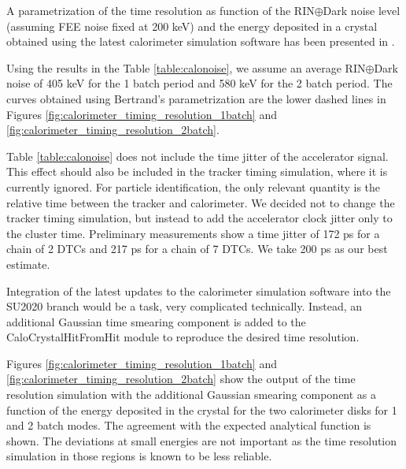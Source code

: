 A parametrization of the time resolution as function of the RIN$\oplus$Dark noise level (assuming FEE noise fixed at 200 keV) and the energy deposited
in a crystal obtained using the latest calorimeter simulation software has been presented in  \cite{MU2E_36225_CALO_TIME_RES}.

Using the results in the Table \ref{table:calonoise}, we assume an average RIN$\oplus$Dark noise of 405 keV for the 1 batch period and 580 keV for the 2 batch period. 
The curves obtained using Bertrand's parametrization are the lower dashed
lines in Figures \ref{fig:calorimeter_timing_resolution_1batch} and  \ref{fig:calorimeter_timing_resolution_2batch}.

Table \ref{table:calonoise} does not include the time jitter of the accelerator signal.
This effect should also be included in the tracker timing simulation, where it is currently
ignored. For particle identification, the only relevant quantity is the relative time
between the tracker and calorimeter. 
We decided not to change the tracker timing simulation, but instead to add the accelerator
clock jitter only to the cluster time.
Preliminary measurements \cite{MU2E_35392_TIME_JITTER} show a time jitter of 172 ps
for a chain of 2 DTCs and 217 ps for a chain of 7 DTCs. We take 200 ps as our best estimate.

Integration of the latest updates to the calorimeter simulation software into the SU2020 branch
would be a task, very complicated technically. Instead, an additional Gaussian time smearing
component is added to the  CaloCrystalHitFromHit module to reproduce the desired time resolution. 

Figures \ref{fig:calorimeter_timing_resolution_1batch} and  \ref{fig:calorimeter_timing_resolution_2batch} show the output of the time resolution
simulation with the additional Gaussian smearing component as a function of the energy deposited
in the crystal for the two calorimeter disks for 1 and 2 batch modes.
The agreement with the expected analytical function is shown. 
The deviations at small energies are not important as the time resolution simulation
in those regions is known to be less reliable.


